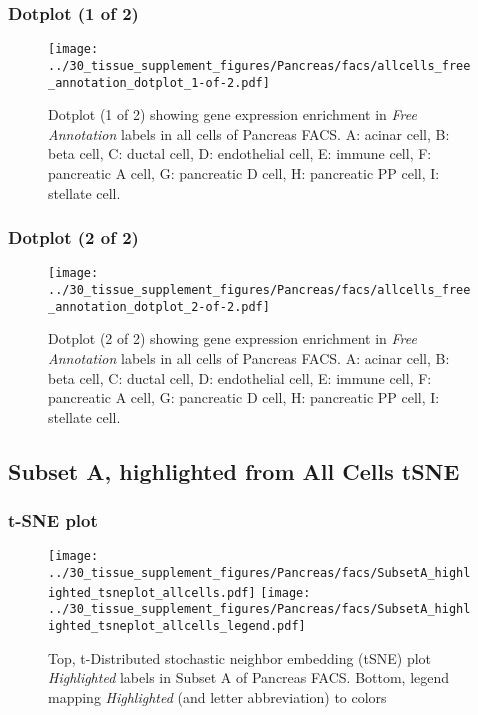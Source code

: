 \subsubsection{Dotplot (1 of 2)}
\begin{figure}[h]
\centering
\texttt{[image: ../30\_tissue\_supplement\_figures/Pancreas/facs/allcells\_free\_annotation\_dotplot\_1-of-2.pdf]}

\caption{ Dotplot (1 of 2)  showing gene expression enrichment in \emph{Free Annotation} labels in all cells of Pancreas FACS. A: acinar cell, B: beta cell, C: ductal cell, D: endothelial cell, E: immune cell, F: pancreatic A cell, G: pancreatic D cell, H: pancreatic PP cell, I: stellate cell.}
\end{figure}


\clearpage

\subsubsection{Dotplot (2 of 2)}
\begin{figure}[h]
\centering
\texttt{[image: ../30\_tissue\_supplement\_figures/Pancreas/facs/allcells\_free\_annotation\_dotplot\_2-of-2.pdf]}

\caption{ Dotplot (2 of 2)  showing gene expression enrichment in \emph{Free Annotation} labels in all cells of Pancreas FACS. A: acinar cell, B: beta cell, C: ductal cell, D: endothelial cell, E: immune cell, F: pancreatic A cell, G: pancreatic D cell, H: pancreatic PP cell, I: stellate cell.}
\end{figure}


\clearpage
\subsection{Subset A, highlighted from All Cells tSNE}
\subsubsection{t-SNE plot}
\begin{figure}[h]
\centering
\texttt{[image: ../30\_tissue\_supplement\_figures/Pancreas/facs/SubsetA\_highlighted\_tsneplot\_allcells.pdf]}
\texttt{[image: ../30\_tissue\_supplement\_figures/Pancreas/facs/SubsetA\_highlighted\_tsneplot\_allcells\_legend.pdf]}
\caption{Top, t-Distributed stochastic neighbor embedding (tSNE) plot  \emph{Highlighted} labels in Subset A of Pancreas FACS. Bottom, legend mapping \emph{Highlighted} (and letter abbreviation) to colors}
\end{figure}


